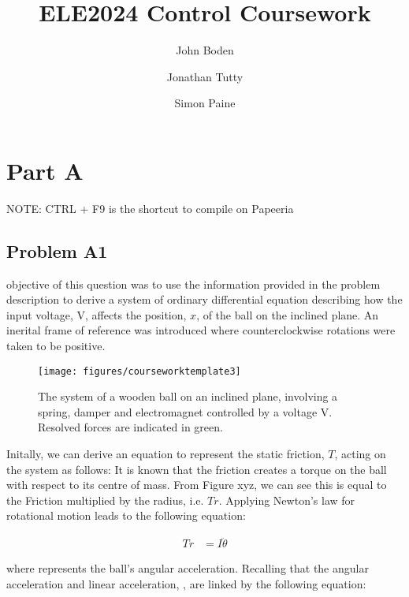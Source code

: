\documentclass[a4paper,10pt,reqno]{amsart}
\title[ELE2024 Coursework]{ELE2024 Control Coursework}
\author[J. Boden]{John Boden}
\author[J. Tutty]{Jonathan Tutty}
\author[S. Paine]{Simon Paine}
\numberwithin{equation}{section}
\begin{document}
\maketitle

\section{Part A}

NOTE: CTRL + F9 is the shortcut to compile on Papeeria

\subsection{Problem A1}\label{sec:a1}
\The objective of this question was to use the information provided in the problem description to derive a system of ordinary differential equation describing how the input voltage, V, affects the position, $x$, of the ball on the inclined plane.
\newline An inerital frame of reference was introduced where counterclockwise rotations were taken to be positive.

\begin{figure}[h]
\centering
\texttt{[image: figures/courseworktemplate3]}
\caption{The system of a wooden ball on an inclined plane, involving a spring, damper and electromagnet controlled by a voltage V. Resolved forces are indicated in green.}
\label{fig:system}
\end{figure}

\newline Initally, we can derive an equation to represent the static friction, $T$, acting on the system as follows:
\newline It is known that the friction creates a torque on the ball with respect to its centre of mass. From Figure xyz, we can see this is equal to the Friction multiplied by the radius, i.e. $Tr$. 
\newline Applying Newton's law for rotational motion leads to the following equation:

\begin{align}
\label{1.1}
Tr &= I\ddot{\theta}
\end{align}

\newline where \ddot{\theta} represents the ball's angular acceleration. Recalling that the angular acceleration and linear acceleration, , are linked by the following equation:
\end{document}
